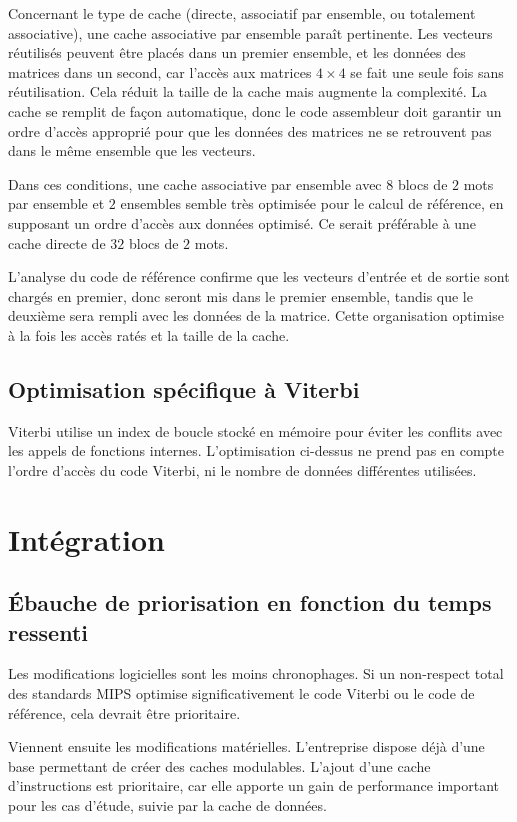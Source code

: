\documentclass[a11paper]{article}
\begin{document}
Concernant le type de cache (directe, associatif par ensemble, ou totalement
associative), une cache associative par ensemble paraît pertinente.
Les vecteurs réutilisés peuvent être placés dans un premier ensemble,
et les données des matrices dans un second, car l'accès aux matrices
$4\times4$ se fait une seule fois sans réutilisation. Cela réduit la taille
de la cache mais augmente la complexité. La cache se remplit de façon
automatique, donc le code assembleur doit garantir un ordre d'accès
approprié pour que les données des matrices ne se retrouvent pas dans
le même ensemble que les vecteurs.

Dans ces conditions, une cache associative par ensemble avec
$8$ blocs de $2$ mots par ensemble et $2$ ensembles semble
très optimisée pour le calcul de référence, en supposant un ordre
d'accès aux données optimisé. Ce serait préférable à une cache
directe de $32$ blocs de $2$ mots.

L'analyse du code de référence confirme que les vecteurs d'entrée
et de sortie sont chargés en premier, donc seront mis dans
le premier ensemble, tandis que le deuxième sera rempli avec
les données de la matrice. Cette organisation optimise à la fois
les accès ratés et la taille de la cache.

\subsection{Optimisation spécifique à Viterbi}

Viterbi utilise un index de boucle stocké en mémoire pour éviter
les conflits avec les appels de fonctions internes. L'optimisation
ci-dessus ne prend pas en compte l'ordre d'accès du code Viterbi,
ni le nombre de données différentes utilisées.

\section{Intégration}

\subsection{Ébauche de priorisation en fonction du temps ressenti}

Les modifications logicielles sont les moins chronophages. Si un non-respect total
des standards MIPS optimise significativement le code Viterbi ou le code de
référence, cela devrait être prioritaire.

Viennent ensuite les modifications matérielles. L'entreprise dispose déjà d'une
base permettant de créer des caches modulables. L'ajout d'une cache d'instructions
est prioritaire, car elle apporte un gain de performance important pour les cas
d'étude, suivie par la cache de données.
\end{document}
